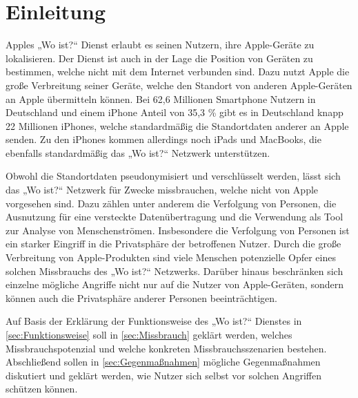 
\section{Einleitung}

Apples „Wo ist?“ Dienst erlaubt es seinen Nutzern, ihre Apple-Geräte zu lokalisieren.
Der Dienst ist auch in der Lage die Position von Geräten zu bestimmen, welche nicht mit dem Internet verbunden sind.
Dazu nutzt Apple die große Verbreitung seiner Geräte, welche den Standort von anderen Apple-Geräten an Apple übermitteln können.
Bei 62,6 Millionen Smartphone Nutzern in Deutschland \cite{Statista_SmartphonesDeutschland} und einem iPhone Anteil von 35,3 \% \cite{Statscounter_Marktanteil_iOS} gibt es in Deutschland knapp 22 Millionen iPhones, welche standardmäßig die Standortdaten anderer an Apple senden.
Zu den iPhones kommen allerdings noch iPads und MacBooks, die ebenfalls standardmäßig das „Wo ist?“ Netzwerk unterstützen.

Obwohl die Standortdaten pseudonymisiert und verschlüsselt werden, lässt sich das „Wo ist?“ Netzwerk für Zwecke missbrauchen, welche nicht von Apple vorgesehen sind.
Dazu zählen unter anderem die Verfolgung von Personen, die Ausnutzung für eine versteckte Datenübertragung und die Verwendung als Tool zur Analyse von Menschenströmen.
Insbesondere die Verfolgung von Personen ist ein starker Eingriff in die Privatsphäre der betroffenen Nutzer.
Durch die große Verbreitung von Apple-Produkten sind viele Menschen potenzielle Opfer eines solchen Missbrauchs des „Wo ist?“ Netzwerks.
Darüber hinaus beschränken sich einzelne mögliche Angriffe nicht nur auf die Nutzer von Apple-Geräten, sondern können auch die Privatsphäre anderer Personen beeinträchtigen.

Auf Basis der Erklärung der Funktionsweise des „Wo ist?“ Dienstes in \autoref{sec:Funktionsweise} soll in \autoref{sec:Missbrauch} geklärt werden, welches Missbrauchspotenzial und welche konkreten Missbrauchsszenarien bestehen.
Abschließend sollen in \autoref{sec:Gegenmaßnahmen} mögliche Gegenmaßnahmen diskutiert und geklärt werden, wie Nutzer sich selbst vor solchen Angriffen schützen können.
